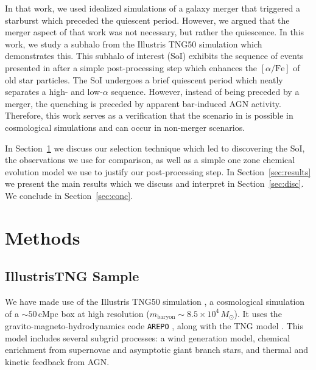 \documentclass[linenumbers, twocolumn]{aastex631}
\newcommand{\Msun}{\ensuremath{M_{\odot}}}
\newcommand{\alphaFe}{\ensuremath{[\alpha/\textrm{Fe}]}}
\begin{document}
In that work, we used idealized simulations of a galaxy merger that triggered a starburst which preceded the quiescent period. However, we argued that the merger aspect of that work was not necessary, but rather the quiescence. In this work, we study a subhalo from the Illustris TNG50 simulation which demonstrates this. This subhalo of interest (SoI) exhibits the sequence of events presented in \citet{2024arXiv240707985B} after a simple post-processing step which enhances the \alphaFe{} of old star particles. The SoI undergoes a brief quiescent period which neatly separates a high- and low-$\alpha$ sequence. However, instead of being preceded by a merger, the quenching is preceded by apparent bar-induced AGN activity. Therefore, this work serves as a verification that the scenario in \citet{2024arXiv240707985B} is possible in cosmological simulations and can occur in non-merger scenarios.

In Section~\ref{sec:methods} we discuss our selection technique which led to discovering the SoI, the observations we use for comparison, as well as a simple one zone chemical evolution model we use to justify our post-processing step. In Section~\ref{sec:results} we present the main results which we discuss and interpret in Section~\ref{sec:disc}. We conclude in Section~\ref{sec:conc}.


\section{Methods}\label{sec:methods}
\subsection{IllustrisTNG Sample}\label{ssec:tng}
We have made use of the Illustris TNG50 simulation \citep{2019MNRAS.490.3196P, 2019MNRAS.490.3234N}, a cosmological simulation of a $\sim50\,\textrm{cMpc}$ box at high resolution ($m_{\textrm{baryon}}\sim8.5\times10^4\,\Msun$). It uses the gravito-magneto-hydrodynamics code \texttt{AREPO} \citep{2010MNRAS.401..791S, 2016MNRAS.455.1134P}, along with the TNG model \citep{2013MNRAS.436.3031V, 2017MNRAS.465.3291W, 2018MNRAS.473.4077P}. This model includes several subgrid processes: a wind generation model, chemical enrichment from supernovae and asymptotic giant branch stars, and thermal and kinetic feedback from AGN.
\end{document}
